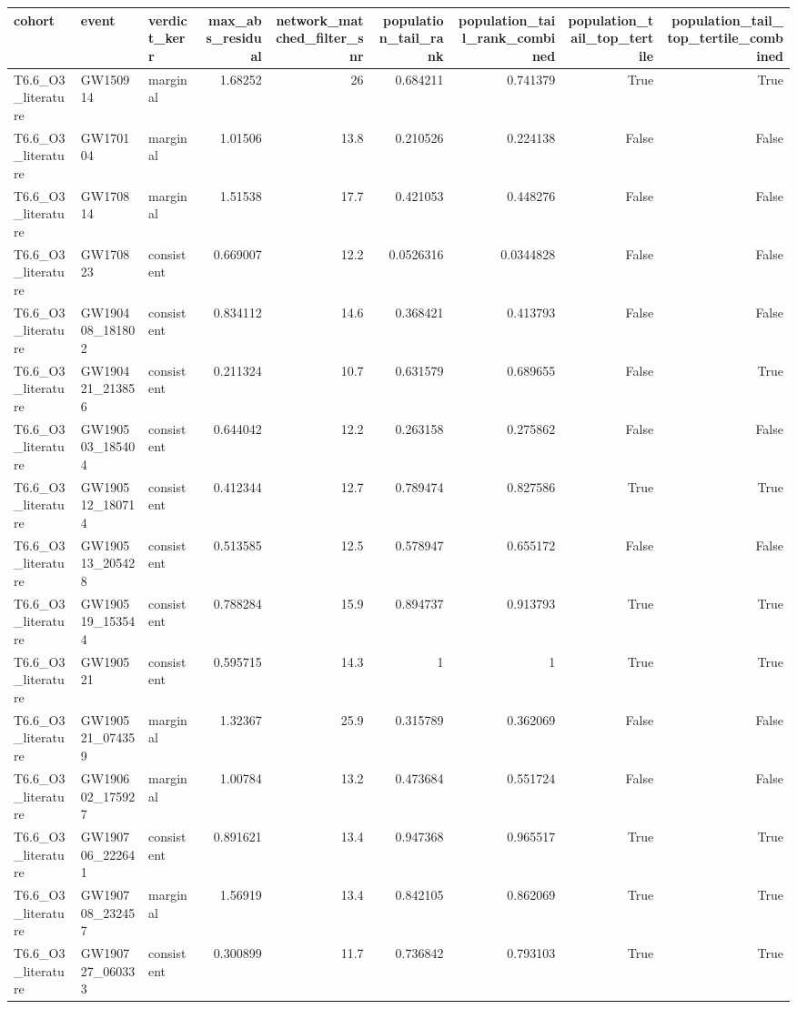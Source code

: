 \begin{tabular}{lllrrrrrr}
\toprule
cohort & event & verdict\_kerr & max\_abs\_residual & network\_matched\_filter\_snr & population\_tail\_rank & population\_tail\_rank\_combined & population\_tail\_top\_tertile & population\_tail\_top\_tertile\_combined \\
\midrule
T6.6\_O3\_literature & GW150914 & marginal & 1.68252 & 26 & 0.684211 & 0.741379 & True & True \\
T6.6\_O3\_literature & GW170104 & marginal & 1.01506 & 13.8 & 0.210526 & 0.224138 & False & False \\
T6.6\_O3\_literature & GW170814 & marginal & 1.51538 & 17.7 & 0.421053 & 0.448276 & False & False \\
T6.6\_O3\_literature & GW170823 & consistent & 0.669007 & 12.2 & 0.0526316 & 0.0344828 & False & False \\
T6.6\_O3\_literature & GW190408\_181802 & consistent & 0.834112 & 14.6 & 0.368421 & 0.413793 & False & False \\
T6.6\_O3\_literature & GW190421\_213856 & consistent & 0.211324 & 10.7 & 0.631579 & 0.689655 & False & True \\
T6.6\_O3\_literature & GW190503\_185404 & consistent & 0.644042 & 12.2 & 0.263158 & 0.275862 & False & False \\
T6.6\_O3\_literature & GW190512\_180714 & consistent & 0.412344 & 12.7 & 0.789474 & 0.827586 & True & True \\
T6.6\_O3\_literature & GW190513\_205428 & consistent & 0.513585 & 12.5 & 0.578947 & 0.655172 & False & False \\
T6.6\_O3\_literature & GW190519\_153544 & consistent & 0.788284 & 15.9 & 0.894737 & 0.913793 & True & True \\
T6.6\_O3\_literature & GW190521 & consistent & 0.595715 & 14.3 & 1 & 1 & True & True \\
T6.6\_O3\_literature & GW190521\_074359 & marginal & 1.32367 & 25.9 & 0.315789 & 0.362069 & False & False \\
T6.6\_O3\_literature & GW190602\_175927 & marginal & 1.00784 & 13.2 & 0.473684 & 0.551724 & False & False \\
T6.6\_O3\_literature & GW190706\_222641 & consistent & 0.891621 & 13.4 & 0.947368 & 0.965517 & True & True \\
T6.6\_O3\_literature & GW190708\_232457 & marginal & 1.56919 & 13.4 & 0.842105 & 0.862069 & True & True \\
T6.6\_O3\_literature & GW190727\_060333 & consistent & 0.300899 & 11.7 & 0.736842 & 0.793103 & True & True \\

\end{tabular}
